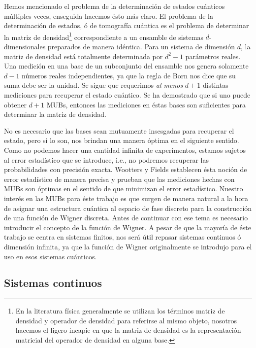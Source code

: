 \documentclass[a4paper]{report}
\begin{document}
  Hemos mencionado el problema de la determinación de
  estados cuánticos múltiples veces, enseguida hacemos ésto
  más claro. El problema de la determinación de estados, ó
  de tomografía cuántica es el problema de determinar la
  matriz de densidad\footnote{En la literatura física
    generalmente se utilizan los términos matriz de densidad
    y operador de densidad para referirse al mismo objeto,
    nosotros hacemos el ligero incapie en que la matriz de
    densidad es la representación matricial del operador de
  densidad en alguna base.} correspondiente a un ensamble
  de sistemas $d$-dimensionales preparados de manera
  idéntica. Para un sistema de dimensión $d$, la matriz de
  densidad está totalmente determinada por $d^2-1$
  parámetros reales. Una medición en una base de un
  subconjunto del ensamble nos genera solamente $d-1$
  números reales independientes, ya que la regla de Born
  nos dice que su suma debe ser la unidad. Se sigue que
  requerimos \textit{al menos} $d+1$ distintas mediciones
  para recuperar el estado cuántico. Se ha demostrado que si
  uno puede obtener $d+1$ MUBs, entonces las mediciones en
  éstas bases son suficientes para determinar la matriz de
  densidad.

  No es necesario que las bases sean mutuamente insesgadas
  para recuperar el estado, pero si lo son, nos brindan una
  manera óptima en el siguiente sentido. Como no podemos
  hacer una cantidad infinita de experimentos, estamos
  sujetos al error estadístico que se introduce, i.e., no
  podremos recuperar las probabilidades con precisión
  exacta. Wootters y Fields  establecen ésta noción de error
  estadístico de manera precisa y prueban que las mediciones
  hechas con MUBs son óptimas en el sentido de que minimizan
  el error estadístico. Nuestro interés en las MUBs para
  éste trabajo es que surgen de manera natural a la hora de
  asignar una estructura cuántica al espacio de fase
  discreto para la construcción de una función de Wigner
  discreta. Antes de continuar con ese tema es necesario
  introducir el concepto de la función de Wigner. A pesar de
  que la mayoría de éste trabajo se centra en sistemas
  finitos, nos será útil repasar sistemas continuos ó
  dimensión infinita, ya que la función de Wigner
  originalmente se introdujo para el uso en esos sistemas
  cuánticos.

  \subsection{Sistemas continuos}
\end{document}
